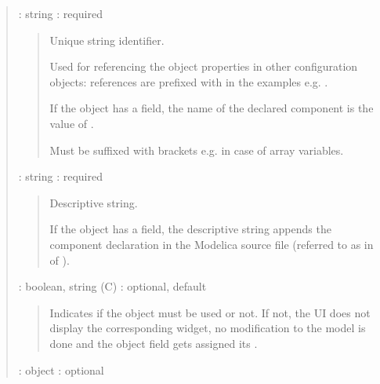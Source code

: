 \documentclass[letterpaper,10pt, openany,english]{sphinxmanual}
\begin{document}
\begin{quote}

 : string : required
\begin{quote}

\begin{DUlineblock}{0em}
\item[] Unique string identifier.
\item[] Used for referencing the object properties in other configuration objects: references are prefixed with \sphinxcode{\sphinxupquote{\#}} in the examples e.g. .
\item[] If the object has a  field, the name of the declared component is the value of .
\item[] Must be suffixed with brackets e.g. \sphinxcode{\sphinxupquote{{[}2{]}}} in case of array variables.
\end{DUlineblock}
\end{quote}

 : string : required
\begin{quote}

\begin{DUlineblock}{0em}
\item[] Descriptive string.
\item[] If the object has a  field, the descriptive string appends the component declaration in the Modelica source file (referred to as  in  of ).
\end{DUlineblock}
\end{quote}

 : boolean, string (C) : optional, default 
\begin{quote}

Indicates if the object must be used or not. If not, the UI does not display the corresponding widget, no modification to the model is done and the object field  gets assigned its .
\end{quote}

 : object : optional
\begin{quote}


\end{quote}
\end{quote}
\end{document}
